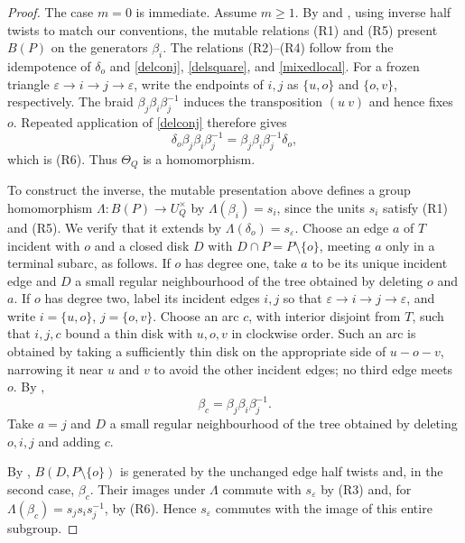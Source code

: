 \documentclass[a4paper, 12pt, reqno]{amsart}
\theoremstyle{definition}
\begin{document}
\begin{proof}
The case $m=0$ is immediate. Assume $m\geq1$. By \cite[Theorem~3.6]{GM2017} and \cite[Definitions~4.4--4.5 and Theorem~6.1]{HHLP2017}, using inverse half twists to match our conventions, the mutable relations (R1) and (R5) present $B(P)$ on the generators $\beta_i$. The relations (R2)--(R4) follow from the idempotence of $\delta_o$ and \eqref{delconj}, \eqref{delsquare}, and \eqref{mixedlocal}. For a frozen triangle
$\varepsilon\to i\to j\to\varepsilon$, write the endpoints of $i,j$ as $\{u,o\}$ and $\{o,v\}$, respectively. The braid $\beta_j\beta_i\beta_j^{-1}$ induces the transposition $(u\ v)$ and hence fixes $o$. Repeated application of \eqref{delconj} therefore gives
\[
\delta_o\beta_j\beta_i\beta_j^{-1}=\beta_j\beta_i\beta_j^{-1}\delta_o,
\]
which is (R6). Thus $\Theta_Q$ is a homomorphism.

To construct the inverse, the mutable presentation above defines a group homomorphism $\Lambda:B(P)\to U_Q^\times$ by $\Lambda(\beta_i)=s_i$, since the units $s_i$ satisfy (R1) and (R5). We verify that it extends by $\Lambda(\delta_o)=s_\varepsilon$. Choose an edge $a$ of $T$ incident with $o$ and a closed disk $D$ with $D\cap P=P\setminus\{o\}$, meeting $a$ only in a terminal subarc, as follows.
If $o$ has degree one, take $a$ to be its unique incident edge and
$D$ a small regular neighbourhood of the tree obtained by deleting
$o$ and $a$.
If $o$ has degree two, label its incident edges $i,j$ so that
$\varepsilon\to i\to j\to\varepsilon$, and write
$i=\{u,o\}$, $j=\{o,v\}$.
Choose an arc $c$, with interior disjoint from $T$, such that
$i,j,c$ bound a thin disk with $u,o,v$ in clockwise order.
Such an arc is obtained by taking a sufficiently thin disk on the
appropriate side of $u-o-v$, narrowing it near $u$ and $v$ to avoid
the other incident edges; no third edge meets $o$.
By \cite[Lemma~3.5]{GM2017},
\[
 \beta_c=\beta_j\beta_i\beta_j^{-1}.
\]
Take $a=j$ and $D$ a small regular neighbourhood of the tree obtained
by deleting $o,i,j$ and adding $c$.

By \cite{Sergiescu1993,Sergiescu1994}, $B(D,P\setminus\{o\})$ is generated by the unchanged edge half twists and, in the second case, $\beta_c$. Their images under $\Lambda$ commute with $s_\varepsilon$ by (R3) and, for $\Lambda(\beta_c)=s_js_is_j^{-1}$, by (R6). Hence $s_\varepsilon$ commutes with the image of this entire subgroup.


\end{proof}
\end{document}
